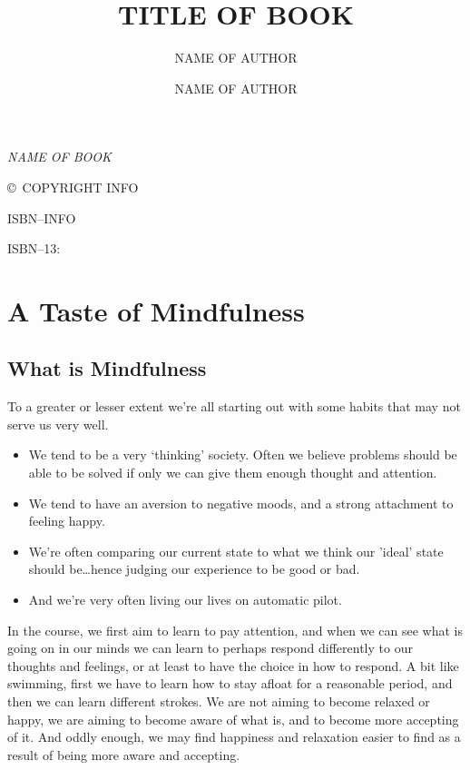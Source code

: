 \documentclass[10pt, twoside, openright, a5paper]{memoir}
\author{NAME OF AUTHOR}
\author{NAME OF AUTHOR}
\title{TITLE OF BOOK}
\date{}
\makeatletter
\def\maketitle{%
  \null
  \thispagestyle{empty}%
  \vfill
  \begin{center}\leavevmode
    \normalfont
    {\LARGE\raggedleft \@author\par}%
    \hrulefill\par
    {\huge\raggedright \@title\par}%
    \vskip 1cm
  \end{center}%
  \vfill
  \null
  \cleardoublepage
  }
\makeatother
\begin{document}
\let\cleardoublepage\clearpage


\maketitle


\frontmatter

\null\vfill

\begin{flushleft}
\textit{NAME OF BOOK}


\copyright\ COPYRIGHT INFO


ISBN--INFO

ISBN--13: 
\bigskip



\end{flushleft}
\let\cleardoublepage\clearpage

\mainmatter
\sloppy

\chapter{A Taste of Mindfulness}

\section{What is Mindfulness}

To a greater or lesser extent we're all starting out with some habits that may not serve us very well.

\begin{itemize}
  \item We tend to be a very `thinking' society. Often we believe problems should be able to be solved if only we can give them enough thought and attention.
  \item We tend to have an aversion to negative moods, and a strong attachment to feeling happy.
  \item We're often comparing our current state to what we think our 'ideal' state should be\ldots hence judging our experience to be good or bad.
  \item And we're very often living our lives on automatic pilot.
\end{itemize}

In the course, we first aim to learn to pay attention, and when we can see what is going on in our minds we can learn to perhaps respond differently to our thoughts and feelings, or at least to have the choice in how to respond. A bit like swimming, first we have to learn how to stay afloat for a reasonable period, and then we can learn different strokes. We are not aiming to become relaxed or happy, we are aiming to become aware of what is, and to become more accepting of it. And oddly enough, we may find happiness and relaxation easier to find as a result of being more aware and accepting.
\end{document}
